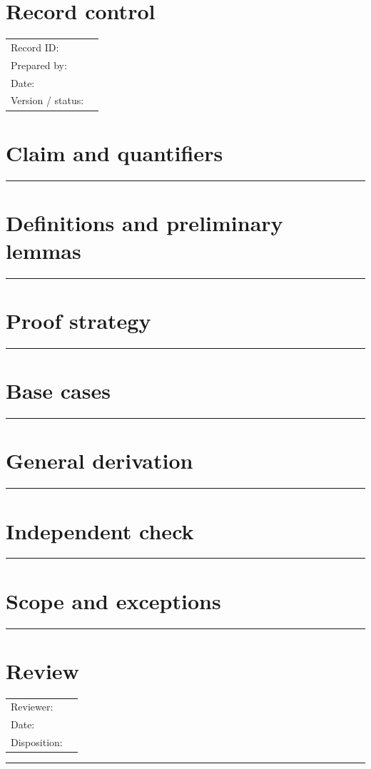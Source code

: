 \documentclass[11pt]{article}
\begin{document}
\makedoctitle
\section{Record control}
\begin{tabularx}{\linewidth}{@{}lX@{}}Record ID: & \hrulefill \\ Prepared by: & \hrulefill \\ Date: & \hrulefill \\ Version / status: & \hrulefill \\\end{tabularx}
\section{Claim and quantifiers}
\vspace{1.75cm}\hrule\vspace{0.35cm}
\section{Definitions and preliminary lemmas}
\vspace{1.75cm}\hrule\vspace{0.35cm}
\section{Proof strategy}
\vspace{1.75cm}\hrule\vspace{0.35cm}
\section{Base cases}
\vspace{1.75cm}\hrule\vspace{0.35cm}
\section{General derivation}
\vspace{1.75cm}\hrule\vspace{0.35cm}
\section{Independent check}
\vspace{1.75cm}\hrule\vspace{0.35cm}
\section{Scope and exceptions}
\vspace{1.75cm}\hrule\vspace{0.35cm}
\section{Review}\begin{tabularx}{\linewidth}{@{}lX@{}}Reviewer: & \hrulefill \\ Date: & \hrulefill \\ Disposition: & \hrulefill \\\end{tabularx}\vspace{0.9cm}\hrule
\end{document}
